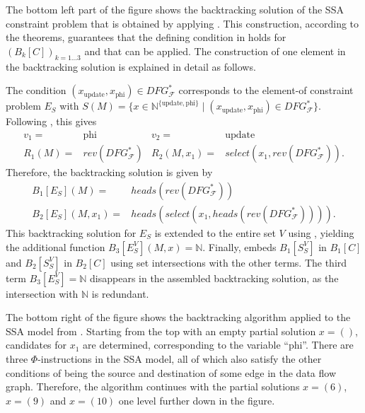     The bottom left part of the figure shows the backtracking solution
    of the SSA constraint problem that is obtained by applying
    .
    This construction, according to the theorems, guarantees that the defining
    condition in  holds for $(B_k[C])_{k=1\dots3}$ and
    that  can be applied.
    The construction of one element in the backtracking solution is
    explained in detail as follows.

    The condition $(x_\text{update},x_\text{phi})\in DFG_\mathcal F^*$
    corresponds to the \mbox{element-of} constraint problem $E_S$ with
    $S(M)=\{x\in\mathbb N^{\{\text{update},\text{phi}\}}\mid (x_\text{update},x_\text{phi})\in DFG_\mathcal F^*\}$.
    Following , this gives
    \begin{align*}
    v_1={}&\text{phi}&v_2={}&\text{update}\\
    R_1(M)={}&rev(DFG_\mathcal F^*)&
    R_2(M,x_1)={}&select(x_1,rev(DFG_\mathcal F^*)).
    \end{align*}
    Therefore, the backtracking solution is given by
    \begin{align*}
        B_1[E_S](M)={}&heads(rev(DFG_\mathcal F^*))\\
        B_2[E_S](M,x_1)={}&heads(select(x_1,heads(rev(DFG_\mathcal F^*)))).
    \end{align*}
    This backtracking solution for $E_S$ is extended to the entire set $V$ using
    , yielding the additional function
    $B_3[E_S^V](M,x)=\mathbb N$.
    Finally,  embeds $B_1[S_S^V]$ in $B_1[C]$ and
    $B_2[S_S^V]$ in $B_2[C]$ using set intersections with the other terms.
    The third term $B_3[E_S^V]=\mathbb N$ disappears in the assembled
    backtracking solution, as the intersection with $\mathbb N$ is redundant.

    The bottom right of the figure shows the backtracking algorithm applied to
    the SSA model from .
    Starting from the top with an empty partial solution $x=()$, candidates for
    $x_1$ are determined, corresponding to the variable ``phi''.
    There are three $\Phi$-instructions in the SSA model, all of which also
    satisfy the other conditions of being the source and destination of some
    edge in the data flow graph.
    Therefore, the algorithm continues with the partial solutions $x=(6)$,
    $x=(9)$ and $x=(10)$ one level further down in the figure.

